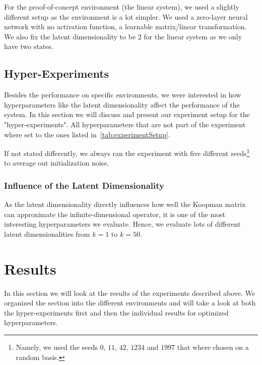 		For the proof-of-concept environment (the linear system), we used a slightly different setup as the environment is a lot simpler. We used a zero-layer neural network with no activation function, \ie a learnable matrix/linear transformation. We also fix the latent dimensionality to be \(2\) for the linear system as we only have two states.

	\subsection{Hyper-Experiments}
		Besides the performance on specific environments, we were interested in how hyperparameters like the latent dimensionality affect the performance of the system. In this section we will discuss and present our experiment setup for the "hyper-experiments". All hyperparameters that are not part of the experiment where set to the ones listed in~\autoref{tab:experimentSetup}.

		If not stated differently, we always ran the experiment with five different seeds\footnote{Namely, we used the seeds \(0\), \(11\), \(42\), \(1234\) and \(1997\) that where chosen on a random basis.} to average out initialization noise.

		\subsubsection{Influence of the Latent Dimensionality}
			\label{subsec:experimentLatentDim}

			As the latent dimensionality directly influences how well the Koopman matrix can approximate the infinite-dimensional operator, it is one of the most interesting hyperparameters we evaluate. Hence, we evaluate lots of different latent dimensionalities from \( k = 1 \) to \( k = 50 \).

\section{Results}
	\label{sec:results}

	In this section we will look at the results of the experiments described above. We organized the section into the different environments and will take a look at both the hyper-experiments first and then the individual results for optimized hyperparameters.

